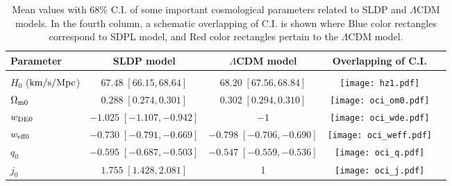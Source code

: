 \documentclass[11pt,a4paper]{article}
\begin{document}
\begin{table}[htb!]\centering\small
\caption{\footnotesize{Mean values with 68\% C.I. of some important cosmological parameters  related to SLDP and $\Lambda$CDM models. In the fourth column, a schematic overlapping of C.I. is shown where Blue color rectangles correspond to SDPL model, and Red color rectangles pertain to the $\Lambda$CDM model.}} 
\begin{tabular}{lcccc}
\hline\hline Parameter & SLDP model  & $\Lambda$CDM model&Overlapping of C.I.\\ \hline\hline\\

$H_0$ (${\rm km/s/Mpc}$)  & $67.48\;[66.15,68.64]$& $68.20\;[67.56,68.84]$& \begin{minipage}{3cm}
      \texttt{[image: hz1.pdf]}
    \end{minipage}\\[8pt]

$\Omega_{\rm m0}$ & $0.288\;[0.274,0.301]$ &$0.302\;[0.294,0.310]$& \begin{minipage}{3cm}
      \texttt{[image: oci\_om0.pdf]}
    \end{minipage}\\[8pt]

$w_{\rm DE0}$ & $ -1.025\;[-1.107,-0.942]$ & $ -1$&\begin{minipage}{3cm}
      \texttt{[image: oci\_wde.pdf]}
    \end{minipage}\\[8pt]

$w_{\rm eff0}$ & $ -0.730\;[-0.791,-0.669]$ & $ -0.798\;[-0.706,-0.690]$&\begin{minipage}{3cm}
      \texttt{[image: oci\_weff.pdf]}
    \end{minipage}\\[8pt]

$q_0$ & $-0.595\;[-0.687,-0.503]$ &$-0.547\; [-0.559,-0.536]$ &\begin{minipage}{3cm}
      \texttt{[image: oci\_q.pdf]}
    \end{minipage}\\[8pt]

$j_{0}$ & $1.755\;[1.428,2.081]$ &1 &\begin{minipage}{3cm}
      \texttt{[image: oci\_j.pdf]}
    \end{minipage} \\[8pt]
    

\end{tabular}
\end{table}
\end{document}
